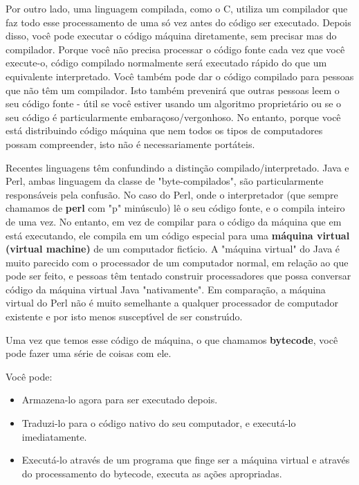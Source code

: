 \documentclass[a4paper,11pt]{book}
\begin{document}
\noindent

\noindent Por outro lado, uma linguagem compilada, como o C, utiliza um compilador que faz todo esse processamento de uma s\'o vez antes do c\'odigo ser executado. Depois disso, voc\^e pode executar o c\'odigo m\'aquina diretamente, sem precisar mas do compilador. Porque voc\^e n\~ao precisa processar o c\'odigo fonte cada vez que voc\^e execute-o, c\'odigo compilado normalmente ser\'a executado r\'apido do que um equivalente interpretado. Voc\^e tamb\'em pode dar o c\'odigo compilado para pessoas que n\~ao t\^em um compilador. Isto tamb\'em prevenir\'a que outras pessoas leem o seu c\'odigo fonte - \'util se voc\^e estiver usando um algoritmo propriet\'ario ou se o seu c\'odigo \'e particularmente embara\c{c}oso/vergonhoso. No entanto, porque voc\^e est\'a distribuindo c\'odigo m\'aquina que nem todos os tipos de computadores possam compreender, isto n\~ao \'e necessariamente port\'ateis.

\noindent 

\noindent Recentes linguagens t\^em confundindo a distin\c{c}\~ao compilado/interpretado. Java e Perl, ambas linguagem da classe  de "byte-compilados", s\~ao particularmente respons\'aveis pela confus\~ao. No caso do Perl, onde o interpretador (que sempre chamamos de \textbf{perl} com "p" min\'usculo) l\^e o seu c\'odigo fonte, e o compila inteiro de uma vez. No entanto, em vez de compilar para o c\'odigo da m\'aquina que em est\'a executando, ele compila em um c\'odigo especial para uma \textbf{m\'aquina virtual (virtual machine)} de um computador fict\'{\i}cio. A "m\'aquina virtual" do Java \'e muito parecido com o processador de um computador normal, em rela\c{c}\~ao ao que pode ser feito, e pessoas t\^em tentado construir processadores que possa conversar c\'odigo da m\'aquina virtual Java "nativamente". Em compara\c{c}\~ao, a m\'aquina virtual do Perl n\~ao \'e muito semelhante a qualquer processador de  computador existente e por isto menos suscept\'{\i}vel de ser constru\'{\i}do.

\noindent 

\noindent Uma vez que temos esse c\'odigo de m\'aquina, o que chamamos \textbf{bytecode}, voc\^e pode fazer uma s\'erie de coisas com ele. 

\noindent Voc\^e pode:

\begin{itemize}

 \item Armazena-lo agora para ser executado depois.

 \item Traduzi-lo para o c\'odigo nativo do seu computador, e execut\'a-lo imediatamente.

 \item Execut\'a-lo atrav\'es de um programa que finge ser a m\'aquina virtual e atrav\'es do processamento do bytecode, executa as a\c{c}\~oes apropriadas.

\end{itemize}
\end{document}
